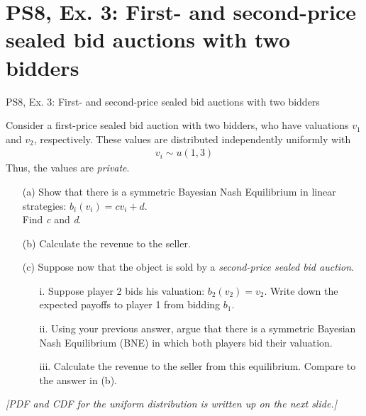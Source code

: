 \section{PS8, Ex. 3: First- and second-price sealed bid auctions with two bidders}

\begin{frame}{PS8, Ex. 3: First- and second-price sealed bid auctions with two bidders}
    \begin{multicols}{2}
      Consider a first-price sealed bid auction with two bidders, who have valuations $v_1$ and $v_2$, respectively. These values are distributed independently uniformly with
      \begin{align*}
        v_i\sim u(1,3)
      \end{align*}
      Thus, the values are \textit{private}.
      \begin{itemize}
        \item[(a)] Show that there is a symmetric Bayesian Nash Equilibrium in linear strategies: $b_i(v_i) = cv_i + d$.\\
                   Find \textit{c} and \textit{d}.
        \item[(b)] Calculate the revenue to the seller.
      \end{itemize}
      \vfill\null\columnbreak
      \begin{itemize}
        \item[(c)] Suppose now that the object is sold by a \textit{second-price sealed bid auction}.
        \begin{itemize}\normalsize
          \item[i.]   Suppose player 2 bids his valuation: $b_2(v_2) = v_2$. Write down the expected payoffs to player 1 from bidding $b_1$.
          \item[ii.]  Using your previous answer, argue that there is a symmetric Bayesian Nash Equilibrium (BNE) in which both players bid their valuation.
          \item[iii.] Calculate the revenue to the seller from this equilibrium. Compare to the answer in (b).
        \end{itemize}
      \end{itemize}
      \vfill\null
    \end{multicols}
    \vspace{-8pt}
    \textit{[PDF and CDF for the uniform distribution is written up on the next slide.]}
\end{frame}
